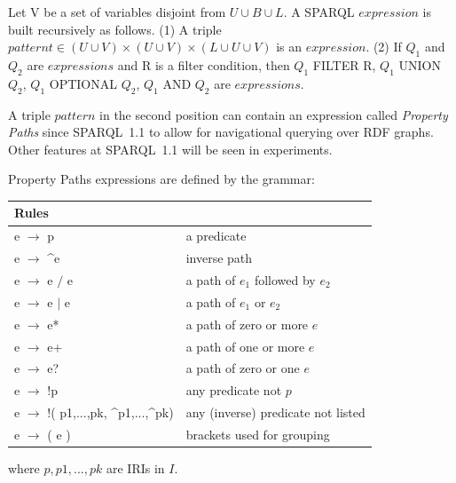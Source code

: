 \documentclass[runningheads]{llncs}
\begin{document}
\begin{definition}
	Let V be a set of variables disjoint from $U \cup B \cup L$. A SPARQL $expression$ is built recursively as follows. (1) A triple $pattern t \in  (U \cup V ) \times (U \cup V ) \times (L \cup U \cup V )$ is an $expression$. (2) If $Q_1$ and $Q_2$ are $expressions$ and R is a filter condition, then $Q_1$ FILTER R, $Q_1$ UNION $Q_2$, $Q_1$ OPTIONAL $Q_2$, $Q_1$ AND $Q_2$ are $expressions$.
\end{definition}

A triple $ pattern $ in the second position can contain an expression called \textit{Property Paths} since SPARQL~1.1 to allow for navigational querying over RDF graphs. Other features at SPARQL~1.1 will be seen in experiments.

\begin{definition}
	\label{eq:pp}
	Property Paths expressions are defined by the grammar:\\
	
	\begin{tabular}{ll}    \hline
		Rules &  \\    \hline
		e $\rightarrow$ p & a predicate \\
		
		e $\rightarrow$ \^{}e    &  inverse path \\
		
		e $\rightarrow$ e $/$ e    &  a path of $ e_1 $ followed by $ e_2 $\\
		
		e $\rightarrow$ e $\mid$ e    &  a path of $ e_1 $ or $ e_2 $ \\
		
		e $\rightarrow$ e*    &  a path of zero or more $ e $ \\
		
		e $\rightarrow$ e+    &  a path of one or more $ e $ \\
		
		e $\rightarrow$ e?    &  a path of zero or one $ e $ \\
		
		e $\rightarrow$ !p    &  any predicate not $ p $ \\
		
		e $\rightarrow$ !( p1,...,pk, \^{}p1,...,\^{}pk)    &  any (inverse) predicate not listed \\
		
		e $\rightarrow$ ( e )    &  brackets used for grouping \\    \hline
	\end{tabular}
	
	where $p, p1,...,pk$ are IRIs in $I$.
\end{definition}
\end{document}
